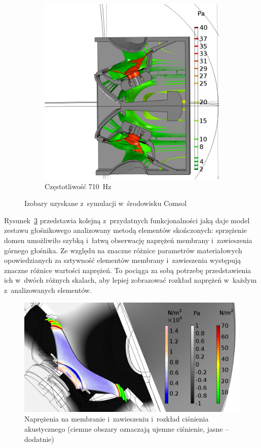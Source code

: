 \documentclass[12pt]{oska}
\begin{document}
\begin{figure}[!ht]
\begin{subfigure}[b]{.49\textwidth}
			\includegraphics[width=\textwidth]{absp_710Hz.png}
			\caption{Częstotliwość \SI{710}{\hertz}}
			\label{r:C_710iz}
		\end{subfigure}
		
		\caption{Izobary uzyskane z~symulacji w~środowisku Comsol}
		\label{r:C_balony}
	\end{figure}
	
	Rysunek~\ref{r:C_przem_cisn} przedstawia kolejną z~przydatnych funkcjonalności jaką daje model zestawu głośnikowego analizowany metodą elementów skończonych: sprzężenie domen umożliwiło szybką i~łatwą obserwację naprężeń membrany i~zawieszenia górnego głośnika. Ze względu na znaczne różnice parametrów materiałowych opowiedzianych za sztywność elementów membrany i~zawieszenia występują znaczne różnice wartości naprężeń. To pociąga za sobą potrzebę przedstawienia ich w~dwóch różnych skalach, aby lepiej zobrazować rozkład naprężeń w~każdym z~analizowanych elementów.
    
   	\begin{figure}[!ht]
        \centering
        \includegraphics[width=\textwidth]{stress_pressure_1kHz.png}
        \caption{Naprężenia na membranie i~zawieszeniu i~rozkład ciśnienia akustycznego (ciemne obszary oznaczają ujemne ciśnienie, jasne -- dodatnie)}
        \label{r:C_przem_cisn}
    \end{figure}
	
\end{document}
